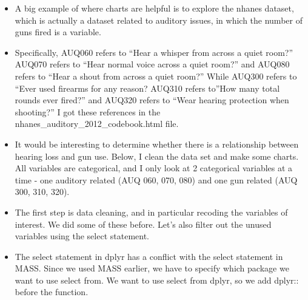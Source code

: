 \documentclass[
  letterpaper,
  DIV=11,
  numbers=noendperiod]{scrreprt}
\providecommand{\tightlist}{%
  \setlength{\itemsep}{0pt}\setlength{\parskip}{0pt}}\usepackage{longtable,booktabs,array}
\begin{document}
\begin{itemize}
\tightlist
\item
  A big example of where charts are helpful is to explore the nhanes
  dataset, which is actually a dataset related to auditory issues, in
  which the number of guns fired is a variable.
\item
  Specifically, AUQ060 refers to ``Hear a whisper from across a quiet
  room?'' AUQ070 refers to ``Hear normal voice across a quiet room?''
  and AUQ080 refers to ``Hear a shout from across a quiet room?'' While
  AUQ300 refers to ``Ever used firearms for any reason? AUQ310 refers
  to''How many total rounds ever fired?'' and AUQ320 refers to ``Wear
  hearing protection when shooting?'' I got these references in the
  nhanes\_auditory\_2012\_codebook.html file.
\item
  It would be interesting to determine whether there is a relationship
  between hearing loss and gun use. Below, I clean the data set and make
  some charts. All variables are categorical, and I only look at 2
  categorical variables at a time - one auditory related (AUQ 060, 070,
  080) and one gun related (AUQ 300, 310, 320).
\item
  The first step is data cleaning, and in particular recoding the
  variables of interest. We did some of these before. Let's also filter
  out the unused variables using the select statement.\\
\item
  The select statement in dplyr has a conflict with the select statement
  in MASS. Since we used MASS earlier, we have to specify which package
  we want to use select from. We want to use select from dplyr, so we
  add dplyr:: before the function.
\end{itemize}
\end{document}
